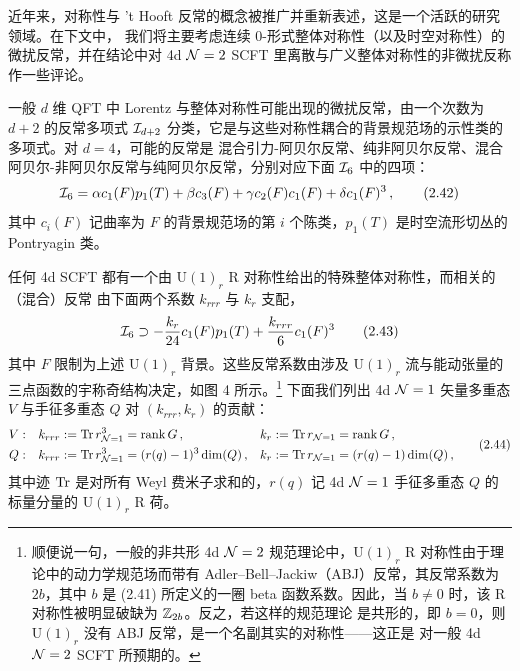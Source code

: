 
近年来，对称性与 't Hooft 反常的概念被推广并重新表述，这是一个活跃的研究领域。在下文中，
我们将主要考虑连续 0-形式整体对称性（以及时空对称性）的微扰反常，并在结论中对 4d $\mathcal{N}=2$
SCFT 里离散与广义整体对称性的非微扰反称作一些评论。

一般 $d$ 维 QFT 中 Lorentz 与整体对称性可能出现的微扰反常，由一个次数为 $d+2$ 的反常多项式
$\mathcal{I}_{d+2}$ 分类，它是与这些对称性耦合的背景规范场的示性类的多项式。对 $d=4$，可能的反常是
混合引力-阿贝尔反常、纯非阿贝尔反常、混合阿贝尔-非阿贝尔反常与纯阿贝尔反常，分别对应下面
$\mathcal{I}_6$ 中的四项：
\begin{equation}
  \mathcal{I}_6=\alpha c_1(F)p_1(T)+\beta c_3(F)+\gamma c_2(F)c_1(F)+\delta c_1(F)^3\,,
  \tag{2.42}
\end{equation}
其中 $c_i(F)$ 记曲率为 $F$ 的背景规范场的第 $i$ 个陈类，$p_1(T)$ 是时空流形切丛的
Pontryagin 类。

任何 4d SCFT 都有一个由 $\mathrm{U}(1)_r$ R 对称性给出的特殊整体对称性，而相关的（混合）反常
由下面两个系数 $k_{rrr}$ 与 $k_r$ 支配，
\begin{equation}
  \mathcal{I}_6\supset-\frac{k_r}{24}c_1(F)p_1(T)+\frac{k_{rrr}}{6}c_1(F)^3
  \tag{2.43}
\end{equation}
其中 $F$ 限制为上述 $\mathrm{U}(1)_r$ 背景。这些反常系数由涉及 $\mathrm{U}(1)_r$ 流与能动张量的
三点函数的宇称奇结构决定，如图 4 所示。\footnote{顺便说一句，一般的非共形 4d $\mathcal{N}=2$
规范理论中，$\mathrm{U}(1)_r$ R 对称性由于理论中的动力学规范场而带有
Adler--Bell--Jackiw（ABJ）反常，其反常系数为 $2b$，其中 $b$ 是 (2.41) 所定义的一圈 beta
函数系数。因此，当 $b\neq0$ 时，该 R 对称性被明显破缺为 $\mathbb{Z}_{2b}$。反之，若这样的规范理论
是共形的，即 $b=0$，则 $\mathrm{U}(1)_r$ 没有 ABJ 反常，是一个名副其实的对称性——这正是
对一般 4d $\mathcal{N}=2$ SCFT 所预期的。} 下面我们列出 4d $\mathcal{N}=1$ 矢量多重态 $V$ 与手征多重态 $Q$
对 $(k_{rrr},k_r)$ 的贡献：
\begin{equation}
  \begin{aligned}
    V:\quad &k_{rrr}:=\operatorname{Tr} r^3_{\mathcal{N}=1}=\operatorname{rank} G\,, & k_r&:=\operatorname{Tr} r_{\mathcal{N}=1}=\operatorname{rank} G\,,\\
    Q:\quad &k_{rrr}:=\operatorname{Tr} r^3_{\mathcal{N}=1}=(r(q)-1)^3\dim(Q)\,, & k_r&:=\operatorname{Tr} r_{\mathcal{N}=1}=(r(q)-1)\dim(Q)\,,
  \end{aligned}
  \tag{2.44}
\end{equation}
其中迹 $\operatorname{Tr}$ 是对所有 Weyl 费米子求和的，$r(q)$ 记 4d $\mathcal{N}=1$ 手征多重态 $Q$ 的标量分量的
$\mathrm{U}(1)_r$ R 荷。

